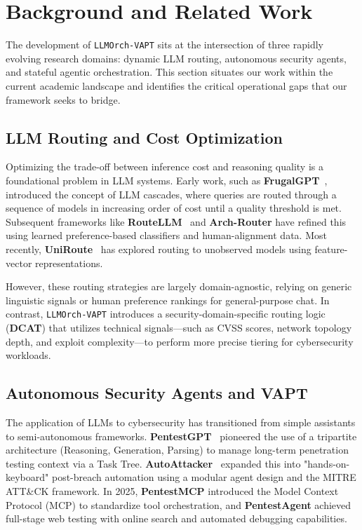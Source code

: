 \section{Background and Related Work}
\label{sec:related}

The development of \texttt{LLMOrch-VAPT} sits at the intersection of three rapidly evolving research domains: dynamic LLM routing, autonomous security agents, and stateful agentic orchestration. This section situates our work within the current academic landscape and identifies the critical operational gaps that our framework seeks to bridge.

\subsection{LLM Routing and Cost Optimization}
Optimizing the trade-off between inference cost and reasoning quality is a foundational problem in LLM systems. Early work, such as \textbf{FrugalGPT}~\cite{frugalgpt}, introduced the concept of LLM cascades, where queries are routed through a sequence of models in increasing order of cost until a quality threshold is met. Subsequent frameworks like \textbf{RouteLLM}~\cite{routellm} and \textbf{Arch-Router} have refined this using learned preference-based classifiers and human-alignment data. Most recently, \textbf{UniRoute}~\cite{uniroute} has explored routing to unobserved models using feature-vector representations.

However, these routing strategies are largely domain-agnostic, relying on generic linguistic signals or human preference rankings for general-purpose chat. In contrast, \texttt{LLMOrch-VAPT} introduces a security-domain-specific routing logic (\textbf{DCAT}) that utilizes technical signals—such as CVSS scores, network topology depth, and exploit complexity—to perform more precise tiering for cybersecurity workloads.

\subsection{Autonomous Security Agents and VAPT}
The application of LLMs to cybersecurity has transitioned from simple assistants to semi-autonomous frameworks. \textbf{PentestGPT}~\cite{pentestgpt} pioneered the use of a tripartite architecture (Reasoning, Generation, Parsing) to manage long-term penetration testing context via a Task Tree. \textbf{AutoAttacker}~\cite{autoattacker} expanded this into "hands-on-keyboard" post-breach automation using a modular agent design and the MITRE ATT\&CK framework. In 2025, \textbf{PentestMCP} introduced the Model Context Protocol (MCP) to standardize tool orchestration, and \textbf{PentestAgent} achieved full-stage web testing with online search and automated debugging capabilities.

